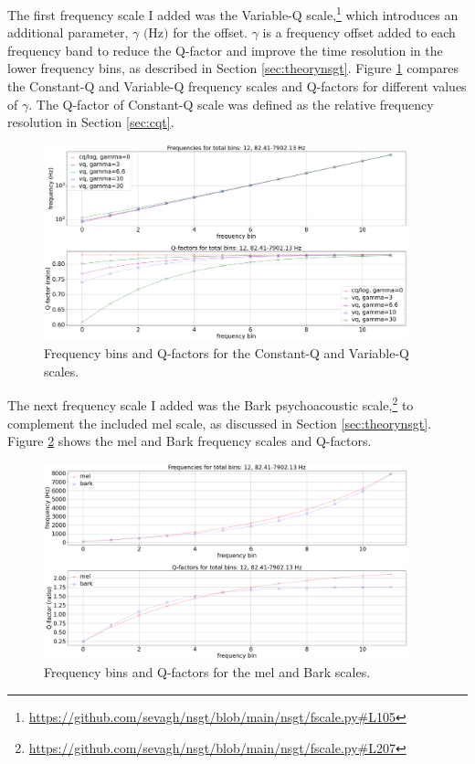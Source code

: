 \documentclass[report.tex]{subfiles}
\begin{document}
The first frequency scale I added was the Variable-Q scale,\footnote{\url{https://github.com/sevagh/nsgt/blob/main/nsgt/fscale.py\#L105}} which introduces an additional parameter, $\gamma \text{ (Hz)}$ for the offset. $\gamma$ is a frequency offset added to each frequency band to reduce the Q-factor and improve the time resolution in the lower frequency bins, as described in Section \ref{sec:theorynsgt}. Figure \ref{fig:vq} compares the Constant-Q and Variable-Q frequency scales and Q-factors for different values of $\gamma$. The Q-factor of Constant-Q scale was defined as the relative frequency resolution in Section \ref{sec:cqt}.

\begin{figure}[ht]
	\centering
	\includegraphics[width=0.9375\textwidth]{./images-freqscales/vqlog.png}
	\caption{Frequency bins and Q-factors for the Constant-Q and Variable-Q scales.}
	\label{fig:vq}
\end{figure}

The next frequency scale I added was the Bark psychoacoustic scale,\footnote{\url{https://github.com/sevagh/nsgt/blob/main/nsgt/fscale.py\#L207}} to complement the included mel scale, as discussed in Section \ref{sec:theorynsgt}. Figure \ref{fig:melbarkfsandqs} shows the mel and Bark frequency scales and Q-factors.

\begin{figure}[ht]
	\centering
	\includegraphics[width=0.9375\textwidth]{./images-freqscales/melbarkpitchesqs.png}
	\caption{Frequency bins and Q-factors for the mel and Bark scales.}
	\label{fig:melbarkfsandqs}
\end{figure}
\end{document}
